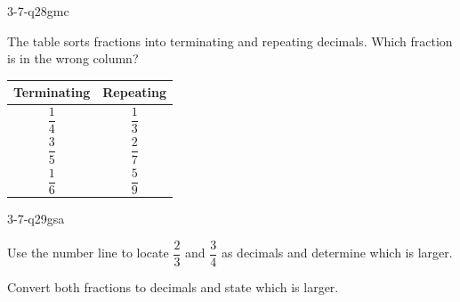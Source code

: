 \begin{practiceQuestion}{3-7-q28}{gmc}
\begin{questionText}
The table sorts fractions into terminating and repeating decimals. Which fraction is in the wrong column?

\begin{center}
\begin{tabular}{|c|c|}
\hline
\textbf{Terminating} & \textbf{Repeating} \\
\hline
$\dfrac{1}{4}$ & $\dfrac{1}{3}$ \\[6pt]
\hline
$\dfrac{3}{5}$ & $\dfrac{2}{7}$ \\[6pt]
\hline
$\dfrac{1}{6}$ & $\dfrac{5}{9}$ \\[6pt]
\hline
\end{tabular}
\end{center}
\end{questionText}
\end{practiceQuestion}

\begin{practiceQuestion}{3-7-q29}{gsa}
\begin{questionText}
Use the number line to locate $\dfrac{2}{3}$ and $\dfrac{3}{4}$ as decimals and determine which is larger.

\begin{center}
\end{center}

Convert both fractions to decimals and state which is larger.
\end{questionText}
\end{practiceQuestion}

